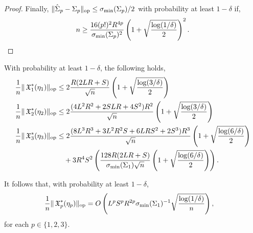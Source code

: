 \begin{proof}
Finally, $\|\hat\Sigma_p - \Sigma_p\|_{\text{\rm op}} \le \sigma_\text{\rm min}(\Sigma_p)/2$ with probability at least $1 - \delta$ if,
$$n \ge \frac{16 (p!)^2 R^{4p}}{\sigma_\text{\rm min}(\Sigma_p)^2} \left(1 + \sqrt{\frac{\log(1/\delta)}{2}}\right)^2.$$

\end{proof}

\begin{lemma}
\label{lem:app:lowRankUpper}
With probability at least $1-\delta$, the following holds,
\begin{align*}
  \frac{1}{n} \|\operatorname{\mathfrak{X}}_1^*(\eta_1)\|_{\text{\rm op}}
      &\le 2 \frac{R (2LR + S)}{\sqrt{n}} \left( 1 + \sqrt{\frac{\log(3/\delta)}{2}} \right) \\
  \frac{1}{n}  \|\operatorname{\mathfrak{X}}_2^*(\eta_2)\|_{\text{\rm op}} 
      &\le 2 \frac{(4L^2 R^2 + 2 S L R + 4S^2)R^2}{\sqrt{n}} \left( 1 + \sqrt{\frac{\log(3/\delta)}{2}} \right) \\
  \frac{1}{n} \|\operatorname{\mathfrak{X}}_3^*(\eta_3)\|_{\text{\rm op}} 
      &\le 2 \frac{(8L^3 R^3 + 3 L^2 R^2 S + 6 L R S^2 + 2S^3) R^3}{\sqrt{n}} \left( 1 + \sqrt{\frac{\log(6/\delta)}{2}} \right) \\
  &\quad + 3 R^4 S^2 \left(\frac{128R(2LR+S)}{\sigma_\text{\rm min}(\Sigma_1) \sqrt{n}} \left(1 + \sqrt{\frac{\log(6/\delta)}{2}} \right) \right).
\end{align*}
\end{lemma}

It follows that, with probability at least $1-\delta$,
\begin{align*}
  \frac{1}{n} \|\operatorname{\mathfrak{X}}_p^*(\eta_p)\|_{\text{\rm op}}
  &= O\left( L^p S^p R^{2p} \sigma_\text{\rm min}(\Sigma_1)^{-1} \sqrt{\frac{\log(1/\delta)}{n}} \right),
\end{align*}
for each $p \in \{1,2,3\}$.

